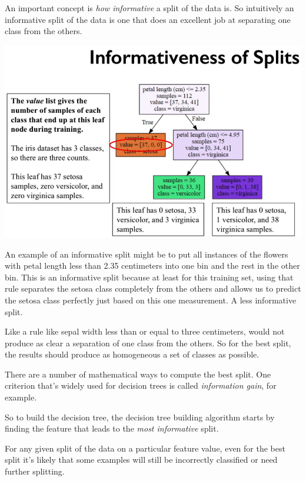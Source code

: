 \begin{multicols}{2}
An important concept is \emph{how informative} a split of the data is. So intuitively an informative split of the data is one that does an excellent job at separating one class from the others. 

\begin{center}
	\includegraphics[width=\linewidth]{img/Decision-Tree-Informativeness-of-Splits.png} 
\end{center} 

An example of an informative split might be to put all instances of the flowers with petal length less than 2.35 centimeters into one bin and the rest in the other bin. This is an informative split because at least for this training set, using that rule separates the setosa class completely from the others and allows us to predict the setosa class perfectly just based on this one measurement. A less informative split. 

Like a rule like sepal width less than or equal to three centimeters, would not produce as clear a separation of one class from the others. So for the best split, the results should produce as homogeneous a set of classes as possible. 

There are a number of mathematical ways to compute the best split. One criterion that's widely used for decision trees is called \emph{information gain}, for example. 

So to build the decision tree, the decision tree building algorithm starts by finding the feature that leads to the \emph{most informative} split. 

For any given split of the data on a particular feature value, even for the best split it's likely that some examples will still be incorrectly classified or need further splitting. 


\end{multicols}
